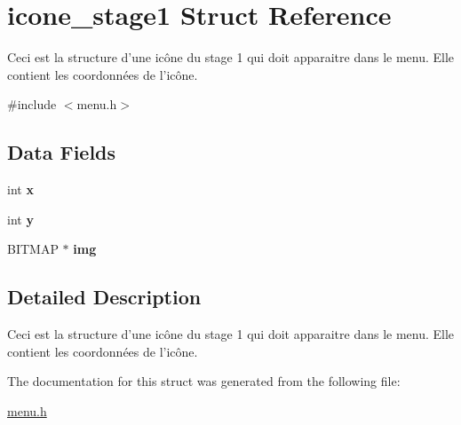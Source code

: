 \hypertarget{structicone__stage1}{\section{icone\-\_\-stage1 Struct Reference}
\label{structicone__stage1}
}


Ceci est la structure d'une icône du stage 1 qui doit apparaitre dans le menu. Elle contient les coordonnées de l'icône.  




{\ttfamily \#include $<$menu.\-h$>$}

\subsection*{Data Fields}
\begin{DoxyCompactItemize}
\item 
\hypertarget{structicone__stage1_a6150e0515f7202e2fb518f7206ed97dc}{int {\bfseries x}}\label{structicone__stage1_a6150e0515f7202e2fb518f7206ed97dc}

\item 
\hypertarget{structicone__stage1_a0a2f84ed7838f07779ae24c5a9086d33}{int {\bfseries y}}\label{structicone__stage1_a0a2f84ed7838f07779ae24c5a9086d33}

\item 
\hypertarget{structicone__stage1_a8eae42c4d58d3ee6b9aa56d0071971fa}{B\-I\-T\-M\-A\-P $\ast$ {\bfseries img}}\label{structicone__stage1_a8eae42c4d58d3ee6b9aa56d0071971fa}

\end{DoxyCompactItemize}


\subsection{Detailed Description}
Ceci est la structure d'une icône du stage 1 qui doit apparaitre dans le menu. Elle contient les coordonnées de l'icône. 


\begin{DoxyItemize}
\item 
\end{DoxyItemize}

The documentation for this struct was generated from the following file\-:\begin{DoxyCompactItemize}
\item 
\hyperlink{menu_8h}{menu.\-h}\end{DoxyCompactItemize}

